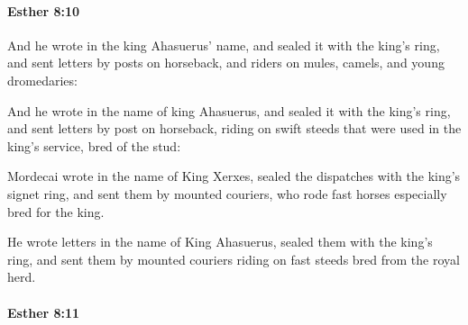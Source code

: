 		\paragraph{Esther 8:10} %
			\label{ESTHER-8-10}

			And he wrote in the king Ahasuerus’ name, and sealed it with the king’s ring, and sent letters by posts on horseback, and riders on mules, camels, and young dromedaries:

			\begin{versebox}
					\item[BHS] 
					\item[LXX] 
					\item[ASV] And he wrote in the name of king Ahasuerus, and sealed it with the king's ring, and sent letters by post on horseback, riding on swift steeds that were used in the king's service, bred of the stud:
					\item[NIV] Mordecai wrote in the name of King Xerxes, sealed the dispatches with the king’s signet ring, and sent them by mounted couriers, who rode fast horses especially bred for the king.
					\item[NRSV] He wrote letters in the name of King Ahasuerus, sealed them with the king’s ring, and sent them by mounted couriers riding on fast steeds bred from the royal herd.
			\end{versebox}

		\paragraph{Esther 8:11} %
			\label{ESTHER-8-11}

